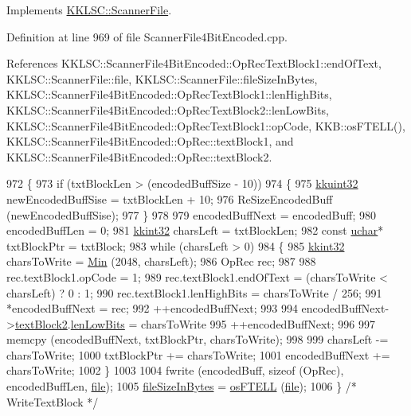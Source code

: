 Implements \hyperlink{class_k_k_l_s_c_1_1_scanner_file_ade81ae552ed646a84a334c49163b9a12}{K\+K\+L\+S\+C\+::\+Scanner\+File}.



Definition at line 969 of file Scanner\+File4\+Bit\+Encoded.\+cpp.



References K\+K\+L\+S\+C\+::\+Scanner\+File4\+Bit\+Encoded\+::\+Op\+Rec\+Text\+Block1\+::end\+Of\+Text, K\+K\+L\+S\+C\+::\+Scanner\+File\+::file, K\+K\+L\+S\+C\+::\+Scanner\+File\+::file\+Size\+In\+Bytes, K\+K\+L\+S\+C\+::\+Scanner\+File4\+Bit\+Encoded\+::\+Op\+Rec\+Text\+Block1\+::len\+High\+Bits, K\+K\+L\+S\+C\+::\+Scanner\+File4\+Bit\+Encoded\+::\+Op\+Rec\+Text\+Block2\+::len\+Low\+Bits, K\+K\+L\+S\+C\+::\+Scanner\+File4\+Bit\+Encoded\+::\+Op\+Rec\+Text\+Block1\+::op\+Code, K\+K\+B\+::os\+F\+T\+E\+L\+L(), K\+K\+L\+S\+C\+::\+Scanner\+File4\+Bit\+Encoded\+::\+Op\+Rec\+::text\+Block1, and K\+K\+L\+S\+C\+::\+Scanner\+File4\+Bit\+Encoded\+::\+Op\+Rec\+::text\+Block2.


\begin{DoxyCode}
972 \{
973   \textcolor{keywordflow}{if}  (txtBlockLen > (encodedBuffSize - 10))
974   \{
975     \hyperlink{namespace_k_k_b_af8d832f05c54994a1cce25bd5743e19a}{kkuint32}  newEncodedBuffSise = txtBlockLen + 10;
976     ReSizeEncodedBuff (newEncodedBuffSise);
977   \}
978 
979   encodedBuffNext = encodedBuff;
980   encodedBuffLen  = 0;
981   \hyperlink{namespace_k_k_b_a8fa4952cc84fda1de4bec1fbdd8d5b1b}{kkint32}  charsLeft = txtBlockLen;
982   \textcolor{keyword}{const} \hyperlink{namespace_k_k_b_ace9969169bf514f9ee6185186949cdf7}{uchar}*  txtBlockPtr = txtBlock;
983   \textcolor{keywordflow}{while}  (charsLeft > 0)
984   \{
985     \hyperlink{namespace_k_k_b_a8fa4952cc84fda1de4bec1fbdd8d5b1b}{kkint32}  charsToWrite = \hyperlink{_raster_8cpp_a6261a282d8ed27242c636ad5fb658585}{Min} (2048, charsLeft);
986     OpRec  rec;
987 
988     rec.textBlock1.opCode = 1;
989     rec.textBlock1.endOfText    = (charsToWrite < charsLeft) ? 0 : 1;
990     rec.textBlock1.lenHighBits  = charsToWrite / 256;
991     *encodedBuffNext = rec;
992     ++encodedBuffNext;
993 
994     encodedBuffNext->\hyperlink{union_scanner_file4_bit_encoded_1_1_op_rec_a1915995bf9087e34eb3964eeb22ac4c1}{textBlock2}.\hyperlink{struct_scanner_file4_bit_encoded_1_1_op_rec_text_block2_a1f19e0c8c61051f93213e7debed8a15e}{lenLowBits}     = charsToWrite %
995     ++encodedBuffNext;
996 
997     memcpy (encodedBuffNext, txtBlockPtr, charsToWrite);
998 
999     charsLeft       -= charsToWrite;
1000     txtBlockPtr     += charsToWrite;
1001     encodedBuffNext += charsToWrite;
1002   \}
1003 
1004   fwrite (encodedBuff, \textcolor{keyword}{sizeof} (OpRec), encodedBuffLen, \hyperlink{class_k_k_l_s_c_1_1_scanner_file_a26db15f7823ce67b1621da17468ec807}{file});
1005   \hyperlink{class_k_k_l_s_c_1_1_scanner_file_aa630f7e950cfd1cd6ecaa901f410728a}{fileSizeInBytes} = \hyperlink{namespace_k_k_b_a2cc11a5ae09d10d69ad751b549e5d94e}{osFTELL} (\hyperlink{class_k_k_l_s_c_1_1_scanner_file_a26db15f7823ce67b1621da17468ec807}{file});
1006 \}  \textcolor{comment}{/* WriteTextBlock */}
\end{DoxyCode}


